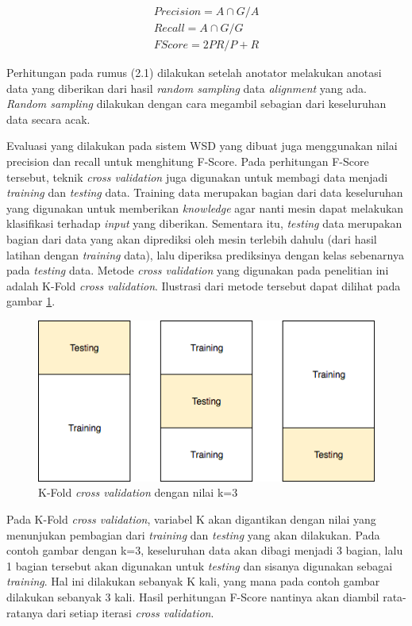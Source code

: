 \begin{equation}
\begin{split}
Precision = A \cap G / A \\
Recall = A \cap G / G \\
FScore = 2 P R / P + R
\end{split}
\end{equation}

Perhitungan pada rumus (2.1) dilakukan setelah anotator melakukan anotasi data yang diberikan dari hasil \textit{random sampling} data \textit{alignment} yang ada. \textit{Random sampling} dilakukan dengan cara megambil sebagian dari keseluruhan data secara acak.

Evaluasi yang dilakukan pada sistem WSD yang dibuat juga menggunakan nilai precision dan recall untuk menghitung F-Score. Pada perhitungan F-Score tersebut, teknik \textit{cross validation} juga digunakan untuk membagi data menjadi \textit{training} dan \textit{testing} data. Training data merupakan bagian dari data keseluruhan yang digunakan untuk memberikan \textit{knowledge} agar nanti mesin dapat melakukan klasifikasi terhadap \textit{input} yang diberikan. Sementara itu, \textit{testing} data merupakan bagian dari data yang akan diprediksi oleh mesin terlebih dahulu (dari hasil latihan dengan \textit{training} data), lalu diperiksa prediksinya dengan kelas sebenarnya pada \textit{testing} data. Metode \textit{cross validation} yang digunakan pada penelitian ini adalah K-Fold \textit{cross validation}. Ilustrasi dari metode tersebut dapat dilihat pada gambar \ref{fig:cross_val}.

\begin{figure}
	\centering
	\includegraphics[width=1\linewidth]{adit_pics/cross_validation}
	\caption{K-Fold \textit{cross validation} dengan nilai k=3}
	\label{fig:cross_val}
\end{figure}

Pada K-Fold \textit{cross validation}, variabel K akan digantikan dengan nilai yang menunjukan pembagian dari \textit{training} dan \textit{testing} yang akan dilakukan. Pada contoh gambar dengan k=3, keseluruhan data akan dibagi menjadi 3 bagian, lalu 1 bagian tersebut akan digunakan untuk \textit{testing} dan sisanya digunakan sebagai \textit{training}. Hal ini dilakukan sebanyak K kali, yang mana pada contoh gambar dilakukan sebanyak 3 kali. Hasil perhitungan F-Score nantinya akan diambil rata-ratanya dari setiap iterasi \textit{cross validation}.